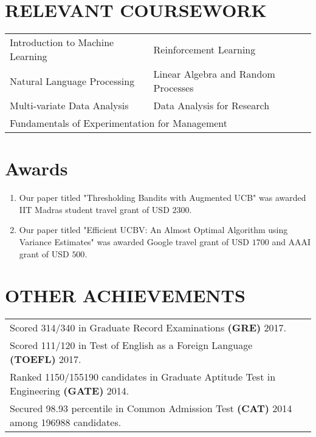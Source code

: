 \documentclass[margin,11pt]{res}
\begin{document}
\begin{resume}
\section{RELEVANT COURSEWORK}
\begin{tabular}{ll}
Introduction to Machine Learning & Reinforcement Learning  \\
Natural Language Processing & Linear Algebra and Random Processes \\
Multi-variate Data Analysis & Data Analysis for Research \\
\multicolumn{2}{l}{Fundamentals of Experimentation for Management}
\end{tabular}

\section{Awards}
\begin{enumerate}
\item Our paper titled "Thresholding Bandits with Augmented UCB" was awarded IIT Madras student travel grant of USD $2300$.
\item Our paper titled "Efficient UCBV: An Almost Optimal Algorithm using Variance Estimates" was awarded Google travel grant of USD $1700$ and AAAI grant of USD $500$.
\end{enumerate}


\section{OTHER ACHIEVEMENTS}
\begin{tabular}{p{12cm}p{80cm}}
Scored 314/340 in Graduate Record Examinations \textbf{(GRE)} 2017.\\
Scored 111/120 in Test of English as a Foreign Language \textbf{(TOEFL)} 2017.\\
Ranked 1150/155190 candidates in Graduate Aptitude Test in Engineering \textbf{(GATE)} 2014. \\
Secured 98.93 percentile in Common Admission Test \textbf{(CAT)} 2014 among 196988 candidates.
\end{tabular}


\end{resume}
\end{document}
